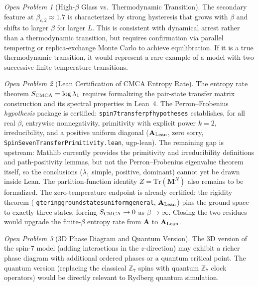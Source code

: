 \documentclass[11pt]{article}
\theoremstyle{remark}
\newtheorem{openprob}{Open Problem}
\newcommand{\lean}[1]{%
  \penalty-100
  \begingroup\def\_{\textunderscore\allowbreak}\texttt{#1}\endgroup}
\newcommand{\CatA}{\textbf{A}}
\newcommand{\CatAL}{\ensuremath{\textbf{A}_{\rm Lean}}}
\begin{document}
\begin{openprob}[High-$\beta$ Glass vs.\ Thermodynamic Transition]
The secondary feature at $\beta_{c,2} \approx 1.7$ is characterized by strong
hysteresis that grows with $\beta$ and shifts to larger $\beta$ for larger $L$.
This is consistent with dynamical arrest rather than a thermodynamic transition,
but requires confirmation via parallel tempering or replica-exchange Monte Carlo
to achieve equilibration. If it is a true thermodynamic transition, it would
represent a rare example of a model with two successive finite-temperature transitions.
\end{openprob}

\begin{openprob}[Lean Certification of CMCA Entropy Rate]
The entropy rate theorem $S_{\rm CMCA} = \log \lambda_1$ requires formalizing
the pair-state transfer matrix construction and its spectral properties in
Lean~4. The Perron--Frobenius \emph{hypothesis} package is certified:
\lean{spin7\_transfer\_pf\_hypotheses} establishes, for all real $\beta$,
entrywise nonnegativity, primitivity with explicit power $k = 2$,
irreducibility, and a positive uniform diagonal (\CatAL{}, zero sorry,
\texttt{SpinSevenTransferPrimitivity.lean}, ugp-lean). The remaining gap is
upstream: Mathlib currently provides the primitivity and irreducibility
definitions and path-positivity lemmas, but not the Perron--Frobenius
eigenvalue theorem itself, so the conclusions ($\lambda_1$ simple, positive,
dominant) cannot yet be drawn inside Lean. The partition-function identity
$Z = \mathrm{Tr}(\mathbf{M}^N)$ also remains to be formalized. The
zero-temperature endpoint is already certified: the rigidity theorem
(\lean{gte\_ring\_ground\_states\_uniform\_general}, \CatAL{}) pins the ground
space to exactly three states, forcing $S_{\rm CMCA} \to 0$ as
$\beta \to \infty$. Closing the two residues would upgrade the finite-$\beta$
entropy rate from \CatA{} to \CatAL{}.
\end{openprob}

\begin{openprob}[3D Phase Diagram and Quantum Version]
The 3D version of the spin-7 model (adding interactions in the $z$-direction)
may exhibit a richer phase diagram with additional ordered phases or a quantum
critical point. The quantum version (replacing the classical $\mathbb{Z}_7$ spins
with quantum $\mathbb{Z}_7$ clock operators) would be directly relevant to Rydberg
quantum simulation.
\end{openprob}
\end{document}
